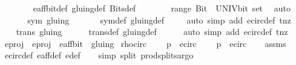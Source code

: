 \begin{isabellebody}
\ \ \ \ \ \ \isamarkupfalse%
\ e{\isacharunderscore}aff{\isacharunderscore}bit{\isacharunderscore}def\ gluing{\isacharunderscore}def\ Bits{\isacharunderscore}def\isanewline
\ \ \ \ \ \ \isamarkupfalse%
\ {\isacartoucheopen}range\ Bit\ {\isacharequal}\ {\isacharparenleft}UNIV{\isacharcolon}{\isacharcolon}bit\ set{\isacharparenright}{\isacartoucheclose}\ \isamarkupfalse%
\ auto\isanewline
\ \ \isamarkupfalse%
\isanewline
\ \ \isanewline
\ \ \isamarkupfalse%
\ {\isachardoublequoteopen}sym\ gluing{\isachardoublequoteclose}\ \isanewline
\ \ \ \ \isamarkupfalse%
\ sym{\isacharunderscore}def\ gluing{\isacharunderscore}def\isanewline
\ \ \ \ \isamarkupfalse%
{\isacharparenleft}auto\ simp\ add{\isacharcolon}\ e{\isacharunderscore}circ{\isacharunderscore}def\ t{\isacharunderscore}nz{\isacharparenright}\isanewline
\ \ \isanewline
\ \ \isamarkupfalse%
\ {\isachardoublequoteopen}trans\ gluing{\isachardoublequoteclose}\isanewline
\ \ \ \ \isamarkupfalse%
\ trans{\isacharunderscore}def\ gluing{\isacharunderscore}def\isanewline
\ \ \ \ \ \isamarkupfalse%
{\isacharparenleft}auto\ simp\ add{\isacharcolon}\ e{\isacharunderscore}circ{\isacharunderscore}def\ t{\isacharunderscore}nz{\isacharparenright}\isanewline
{}\isamarkupfalse%
%
\endisatagproof
{\isafoldproof}%
%
\isadelimproof
\isanewline
%
\endisadelimproof
\isanewline
{}\isamarkupfalse%
\ e{\isacharunderscore}proj\ \ {\isachardoublequoteopen}e{\isacharunderscore}proj\ {\isacharequal}\ e{\isacharunderscore}aff{\isacharunderscore}bit\ {\isacharslash}{\isacharslash}\ gluing{\isachardoublequoteclose}\isanewline
\isanewline
{}\isamarkupfalse%
\ rho{\isacharunderscore}circ{\isacharcolon}\ \isanewline
\ \ \ {\isachardoublequoteopen}p\ {\isasymin}\ e{\isacharunderscore}circ{\isachardoublequoteclose}\isanewline
\ \ \ {\isachardoublequoteopen}{\isasymrho}\ p\ {\isasymin}\ e{\isacharunderscore}circ{\isachardoublequoteclose}\isanewline
%
\isadelimproof
\ \ %
\endisadelimproof
%
\isatagproof
{}\isamarkupfalse%
\ assms\ \isamarkupfalse%
\ e{\isacharunderscore}circ{\isacharunderscore}def\ e{\isacharunderscore}aff{\isacharunderscore}def\ e{\isacharprime}{\isacharunderscore}def\ \isanewline
\ \ \isamarkupfalse%
{\isacharparenleft}simp\ split{\isacharcolon}\ prod{\isachardot}splits{\isacharcomma}argo{\isacharparenright}%

\end{isabellebody}
